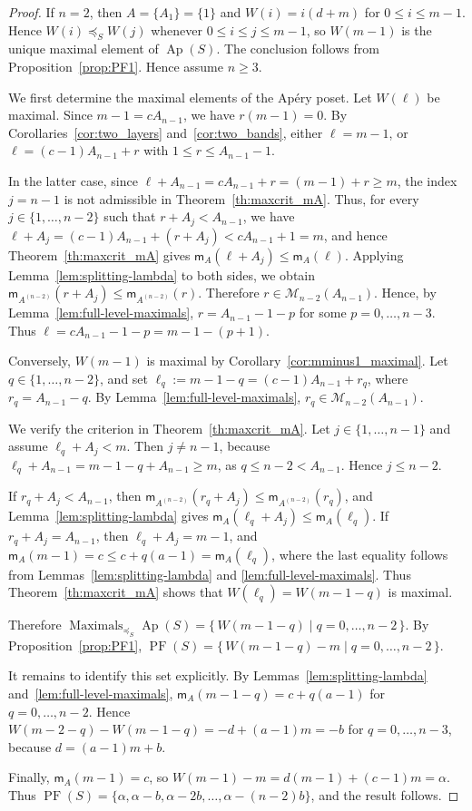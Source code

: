 \documentclass[12pt,a4paper]{amsart}
\theoremstyle{definition}
\begin{document}
\begin{proof}
If $n=2$, then $A=\{A_1\}=\{1\}$ and
$W(i)=i(d+m)$ for $0\le i\le m-1$. Hence
$W(i)\preceq_S W(j)$ whenever $0\le i\le j\le m-1$, so
$W(m-1)$ is the unique maximal element of $\operatorname{Ap}(S)$. The conclusion follows from Proposition~\ref{prop:PF1}. Hence assume $n\ge 3$.

We first determine the maximal elements of the Ap\'ery poset. Let
$W(\ell)$ be maximal. Since $m-1=cA_{n-1}$, we have $r(m-1)=0$. By
Corollaries~\ref{cor:two_layers} and~\ref{cor:two_bands}, either
$\ell=m-1$, or $\ell=(c-1)A_{n-1}+r$ with $1\le r\le A_{n-1}-1$.

In the latter case, since $
\ell+A_{n-1}=cA_{n-1}+r=(m-1)+r\ge m$,
the index $j=n-1$ is not admissible in Theorem~\ref{th:maxcrit_mA}.
Thus, for every $j\in\{1,\ldots,n-2\}$ such that $r+A_j<A_{n-1}$, we have
$
\ell+A_j=(c-1)A_{n-1}+(r+A_j)<cA_{n-1}+1=m$,
and hence Theorem~\ref{th:maxcrit_mA} gives
$
\mathsf m_A(\ell+A_j)\le \mathsf m_A(\ell).
$
Applying Lemma~\ref{lem:splitting-lambda} to both sides, we obtain $
\mathsf m_{A^{(n-2)}}(r+A_j)\le \mathsf m_{A^{(n-2)}}(r)$.
Therefore $r\in \mathcal M_{n-2}(A_{n-1})$. Hence, by
Lemma~\ref{lem:full-level-maximals}, $r=A_{n-1}-1-p$ for some
$p=0,\ldots,n-3$. Thus $\ell=cA_{n-1}-1-p=m-1-(p+1)$.

Conversely, $W(m-1)$ is maximal by
Corollary~\ref{cor:mminus1_maximal}. Let $q\in\{1,\ldots,n-2\}$, and set
$\ell_q:=m-1-q=(c-1)A_{n-1}+r_q$, where $r_q=A_{n-1}-q$. By
Lemma~\ref{lem:full-level-maximals}, $r_q\in\mathcal M_{n-2}(A_{n-1})$.

We verify the criterion in Theorem~\ref{th:maxcrit_mA}. Let
$j\in\{1,\ldots,n-1\}$ and assume $\ell_q+A_j<m$. Then $j\ne n-1$,
because $\ell_q+A_{n-1}=m-1-q+A_{n-1}\ge m$, as
$q\le n-2<A_{n-1}$. Hence $j\le n-2$.

If $r_q+A_j<A_{n-1}$, then
$\mathsf m_{A^{(n-2)}}(r_q+A_j)\le\mathsf m_{A^{(n-2)}}(r_q)$, and
Lemma~\ref{lem:splitting-lambda} gives
$\mathsf m_A(\ell_q+A_j)\le\mathsf m_A(\ell_q)$. If
$r_q+A_j=A_{n-1}$, then $\ell_q+A_j=m-1$, and
$\mathsf m_A(m-1)=c\le c+q(a-1)=\mathsf m_A(\ell_q)$, where the last
equality follows from Lemmas~\ref{lem:splitting-lambda} and
\ref{lem:full-level-maximals}. Thus Theorem~\ref{th:maxcrit_mA} shows
that $W(\ell_q)=W(m-1-q)$ is maximal.

Therefore $\operatorname{Maximals}_{\preceq_S}\operatorname{Ap}(S)
=
\{\,W(m-1-q)\mid q=0,\ldots,n-2\,\}$.
By Proposition~\ref{prop:PF1},
$\operatorname{PF}(S)=\{\,W(m-1-q)-m\mid q=0,\ldots,n-2\,\}$.

It remains to identify this set explicitly. By
Lemmas~\ref{lem:splitting-lambda} and~\ref{lem:full-level-maximals},
$\mathsf m_A(m-1-q)=c+q(a-1)$ for $q=0,\ldots,n-2$. Hence
$W(m-2-q)-W(m-1-q)=-d+(a-1)m=-b$ for $q=0,\ldots,n-3$, because
$d=(a-1)m+b$.

Finally, $\mathsf m_A(m-1)=c$, so
$W(m-1)-m=d(m-1)+(c-1)m=\alpha$. Thus
$\operatorname{PF}(S)=
\{\alpha,\alpha-b,\alpha-2b,\ldots,\alpha-(n-2)b\}$, and the result
follows.
\end{proof}
\end{document}
